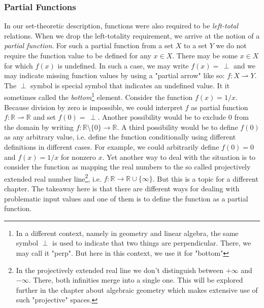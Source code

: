 



\subsubsection{Partial Functions}
In our set-theoretic description, functions were also required to be \emph{left-total} relations. When we drop the left-totality requirement, we arrive at the notion of a \emph{partial function}. For such a partial function from a set $X$ to a set $Y$ we do not require the function value to be defined for any $x \in X$. There may be some $x \in X$ for which $f(x)$ is undefined. In such a case, we may write $f(x) = \, \perp$ and we may indicate missing function values by using a "partial arrow" like so: $f: X \rightharpoonup Y$. The $\perp$ symbol is special symbol that indicates an undefined value. It it sometimes called the \emph{bottom}\footnote{In a different context, namely in geometry and linear algebra, the same symbol $\perp$ is used to indicate that two things are perpendicular. There, we may call it "perp". But here in this context, we use it for "bottom"} element. Consider the function $f(x) = 1/x$. Because division by zero is impossible, we could interpret $f$ as partial function $f: \mathbb{R} \rightharpoonup \mathbb{R}$ and set $f(0) = \, \perp$. Another possibility would be to exclude $0$ from the domain by writing $f: \mathbb{R} \setminus \{ 0 \} \rightarrow \mathbb{R}$. A third possibility would be to define $f(0)$ as any arbitrary value, i.e. define the function conditionally using different definitions in different cases. For example, we could arbitrarily define $f(0) = 0$ and $f(x) = 1/x$ for nonzero $x$. Yet another way to deal with the situation is to consider the function as mapping the real numbers to the so called projectively extended real number line\footnote{In the projectively extended real line we don't distinguish between $+\infty$ and $-\infty$. There, both infinities merge into a single one. This will be explored further in the chapter about algebraic geometry which makes extensive use of such "projective" spaces.}, i.e. $f: \mathbb{R} \rightarrow \mathbb{R} \cup \{ \infty \}$. But this is a topic for a different chapter. The takeaway here is that there are different ways for dealing with problematic input values and one of them is to define the function as a partial function.


